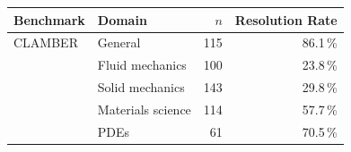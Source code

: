 \begin{tabular}{llrr}
\toprule
\textbf{Benchmark} & \textbf{Domain} & $n$ & \textbf{Resolution Rate} \\
\midrule
CLAMBER \cite{zhang2024clamber} & General & 115 & 86.1\,\% \\
\midrule
{} & Fluid mechanics & 100 & 23.8\,\% \\
 & Solid mechanics & 143 & 29.8\,\% \\
 & Materials science & 114 & 57.7\,\% \\
 & PDEs & 61 & 70.5\,\% \\
\bottomrule
\end{tabular}